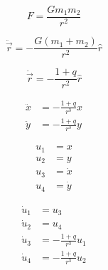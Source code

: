 \documentclass[a4paper,twoside,12pt,hidelinks]{article}
\begin{document}
\thispagestyle{empty}

\begin{equation*}
  F = \frac{G m_1 m_2}{r^2}
\end{equation*}


\begin{equation*}
  \ddot{\vec{r}} = - \frac{G (m_1 + m_2)}{r^2} \hat{r}
\end{equation*}

\begin{equation*}
  \ddot{\vec{r}} = - \frac{1 + q}{r^2} \hat{r}
\end{equation*}

\begin{align*}
  \ddot{x} &= - \frac{1 + q}{r^3} x \\
  \ddot{y} &= - \frac{1 + q}{r^3} y
\end{align*}


\begin{align*}
  u_1 &= x \\
  u_2 &= y \\
  u_3 &= \dot{x} \\
  u_4 &= \dot{y}
\end{align*}


\begin{align*}
  \dot{u}_1 &= u_3 \\
  \dot{u}_2 &= u_4 \\
  \dot{u}_3 &= - \frac{1 + q}{r^3} u_1 \\
  \dot{u}_4 &= - \frac{1 + q}{r^3} u_2
\end{align*}
\end{document}

